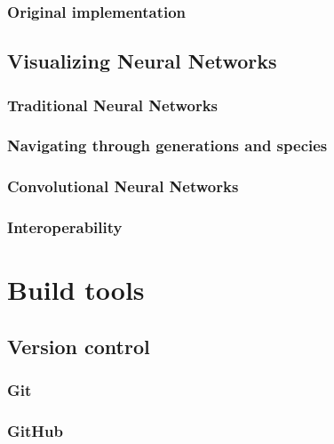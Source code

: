 \documentclass[11pt]{article}
\begin{document}
			\subsubsection{Original implementation}
				
        \subsection{Visualizing Neural Networks}
			\subsubsection{Traditional Neural Networks}
		    	
		    \subsubsection{Navigating through generations and species}
			    
			    \newpage
			\subsubsection{Convolutional Neural Networks}
	            
	        \subsubsection{Interoperability}
	        	
    \newpage

	\section{Build tools}
		\subsection{Version control}
			
			\subsubsection{Git}
				
			\subsubsection{GitHub}
				
\end{document}
